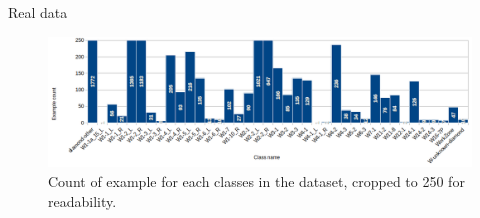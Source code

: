 \documentclass{beamer}
\begin{document}
\begin{frame}{Real data}
    \begin{figure}
        \centering
        \includegraphics[width=\linewidth]{figures/data_repartition.png}
        \caption{Count of example for each classes in the dataset, cropped to 250 for readability.}
        \label{fig:data_count}
    \end{figure}{}
\end{frame}{}
\end{document}
